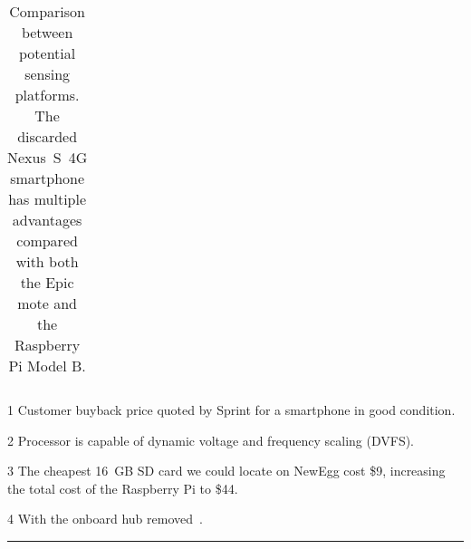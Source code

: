 \begin{table*}[t]
\begin{threeparttable}
{\begin{tabularx}{\textwidth}{rXXX}
\end{tabularx}
}
{\footnotesize
\begin{tablenotes}
\item [1] Customer buyback price quoted by Sprint for a smartphone in good
condition.
\item [2] Processor is capable of dynamic voltage and frequency scaling
(DVFS).
\item [3] The cheapest 16~GB SD card we could locate on NewEgg cost \$9,
increasing the total cost of the Raspberry Pi to \$44.

\item [4] With the onboard hub removed~\cite{rpipower-url}.

\end{tablenotes}
}

\vspace*{-0.1in}

\caption{Comparison between potential sensing platforms. \textnormal{The
discarded Nexus~S~4G smartphone has multiple advantages compared with both
the Epic mote and the Raspberry Pi Model B.}}

\vspace*{0.1in}
\hrule
\vspace*{-0.2in}

\end{threeparttable}
\label{table-comparison}
\end{table*}
